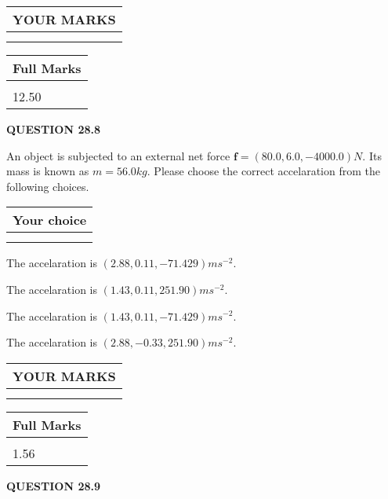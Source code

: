 \documentclass[12pt]{article}
\begin{document}
 

 
\vspace{0.3in}
  
\vspace{0.2in}
  
\noindent\begin{tabular}{|l|}
\hline
 YOUR MARKS  \\
\hline
 \\ 
 \\ 
\hline
\end{tabular}
\hspace{0.05in} \begin{tabular}{|l|}
\hline
 Full Marks  \\
\hline
 \\ 
12.50 \\
\hline
\end{tabular}
{\textbf{\Large{QUESTION
28.8 
}}}
  
  
 
An object is subjected to an external net force $\mathbf{f}=
(80.0 , 6.0 , -4000.0) N$.
Its mass is known as $m= %
56.0 kg$.
Please choose the correct accelaration from the following choices.
  
  
\noindent\hspace{3.0in} \begin{tabular}{|l|}
\hline
Your choice \\
\hline
 \\ 
 \\ 
\hline
\end{tabular}
  
  
 
 
  The accelaration is $  %
(
2.88,
0.11,
-71.429)
ms^{-2} $.
 
 
  The accelaration is $  %
(
1.43,
0.11,
251.90)
ms^{-2} $.
 
 
  The accelaration is $  %
(
1.43,
0.11,
-71.429)
ms^{-2} $.
 
 
  The accelaration is $  %
(
2.88,
-0.33,
251.90)
ms^{-2} $.
 
 
 

 
 
\vspace{0.3in}
  
\vspace{0.2in}
  
\noindent\begin{tabular}{|l|}
\hline
 YOUR MARKS  \\
\hline
 \\ 
 \\ 
\hline
\end{tabular}
\hspace{0.05in} \begin{tabular}{|l|}
\hline
 Full Marks  \\
\hline
 \\ 
1.56 \\
\hline
\end{tabular}
{\textbf{\Large{QUESTION
28.9 
}}}
  
\end{document}

